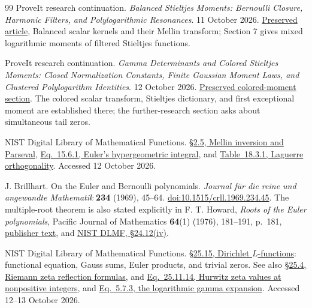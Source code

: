 \begin{thebibliography}{99}
ProveIt research continuation.
\emph{Balanced Stieltjes Moments: Bernoulli Closure, Harmonic Filters,
and Polylogarithmic Resonances}. 11 October 2026.
\href{https://github.com/VladimirReshetnikov/ProveIt/blob/0cdfdf14eff2e404ff3060ae7ca8048f251828a8/Analysis/Polylogarithms/docs/reports/stieltjes-correlation-calculus/continuations/balanced-stieltjes-moments/article/Balanced_Stieltjes_Moments.tex}{Preserved article},
Balanced scalar kernels and their Mellin transform; Section 7 gives mixed
logarithmic moments of filtered Stieltjes functions.

ProveIt research continuation.
\emph{Gamma Determinants and Colored Stieltjes Moments: Closed
Normalization Constants, Finite Gaussian Moment Laws, and Clustered
Polylogarithm Identities}. 12 October 2026.
\href{https://github.com/VladimirReshetnikov/ProveIt/blob/4b9e83b4bf3379a7f11415b8e1422561f3a9e798/Analysis/Polylogarithms/docs/reports/stieltjes-harmonic-resonance/continuations/gamma-normalizations-colored-moments/sections/03_colored.tex}{Preserved colored-moment section}.
The colored scalar transform, Stieltjes dictionary, and first exceptional
moment are established there; the further-research section asks about
simultaneous tail zeros.

NIST Digital Library of Mathematical Functions.
\href{https://dlmf.nist.gov/2.5}{\S2.5, Mellin inversion and Parseval},
\href{https://dlmf.nist.gov/15.6.E1}{Eq.~15.6.1, Euler's hypergeometric integral},
and \href{https://dlmf.nist.gov/18.3}{Table~18.3.1, Laguerre orthogonality}.
Accessed 12 October 2026.

J. Brillhart. On the Euler and Bernoulli polynomials.
\emph{Journal f\"ur die reine und angewandte Mathematik}
\textbf{234} (1969), 45--64.
\href{https://doi.org/10.1515/crll.1969.234.45}{doi:10.1515/crll.1969.234.45}.
The multiple-root theorem is also stated explicitly in F. T. Howard,
\emph{Roots of the Euler polynomials}, Pacific Journal of Mathematics
\textbf{64}(1) (1976), 181--191, p.~181,
\href{https://msp.org/pjm/1976/64-1/pjm-v64-n1-p17-s.pdf}{publisher text},
and \href{https://dlmf.nist.gov/24.12.iv}{NIST DLMF, \S24.12(iv)}.

NIST Digital Library of Mathematical Functions.
\href{https://dlmf.nist.gov/25.15}{\S25.15, Dirichlet $L$-functions}:
functional equation, Gauss sums, Euler products, and trivial zeros.
See also \href{https://dlmf.nist.gov/25.4}{\S25.4, Riemann zeta reflection
formulas}, and \href{https://dlmf.nist.gov/25.11.E14}{Eq.~25.11.14,
Hurwitz zeta values at nonpositive integers}, and
\href{https://dlmf.nist.gov/5.7.E3}{Eq.~5.7.3, the logarithmic gamma expansion}.
Accessed 12--13 October 2026.


\end{thebibliography}
